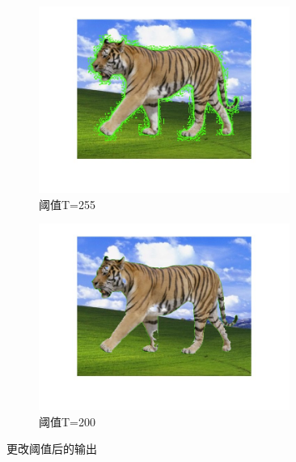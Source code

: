 \documentclass[UTF8]{article}
\begin{document}
\begin{figure}[htbp]
    \centering
    \begin{subfigure}{0.45\textwidth}
      \centering
      \includegraphics[width=0.9\textwidth]{img/outBig.jpg}
      \caption{阈值T=255}
      \label{fig:outBig} %
    \end{subfigure}
    \begin{subfigure}{0.45\textwidth}
      \centering
      \includegraphics[width=0.9\textwidth]{img/outSmall.jpg}
      \caption{阈值T=200}
      \label{fig:outSmall} %
    \end{subfigure}
    \caption{更改阈值后的输出}
    \label{fig:前后} %
\end{figure}
\end{document}
